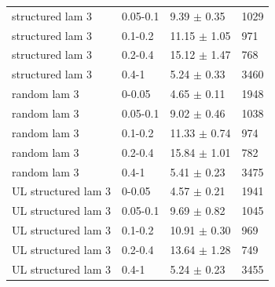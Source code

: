 \begin{tabular}{llll}
structured lam 3 & 0.05-0.1 & 9.39 $\pm$ 0.35 & 1029 \\
structured lam 3 & 0.1-0.2 & 11.15 $\pm$ 1.05 & 971 \\
structured lam 3 & 0.2-0.4 & 15.12 $\pm$ 1.47 & 768 \\
structured lam 3 & 0.4-1 & 5.24 $\pm$ 0.33 & 3460 \\
random lam 3 & 0-0.05 & 4.65 $\pm$ 0.11 & 1948 \\
random lam 3 & 0.05-0.1 & 9.02 $\pm$ 0.46 & 1038 \\
random lam 3 & 0.1-0.2 & 11.33 $\pm$ 0.74 & 974 \\
random lam 3 & 0.2-0.4 & 15.84 $\pm$ 1.01 & 782 \\
random lam 3 & 0.4-1 & 5.41 $\pm$ 0.23 & 3475 \\
UL structured lam 3 & 0-0.05 & 4.57 $\pm$ 0.21 & 1941 \\
UL structured lam 3 & 0.05-0.1 & 9.69 $\pm$ 0.82 & 1045 \\
UL structured lam 3 & 0.1-0.2 & 10.91 $\pm$ 0.30 & 969 \\
UL structured lam 3 & 0.2-0.4 & 13.64 $\pm$ 1.28 & 749 \\
UL structured lam 3 & 0.4-1 & 5.24 $\pm$ 0.23 & 3455 \\
\hline
\end{tabular}
